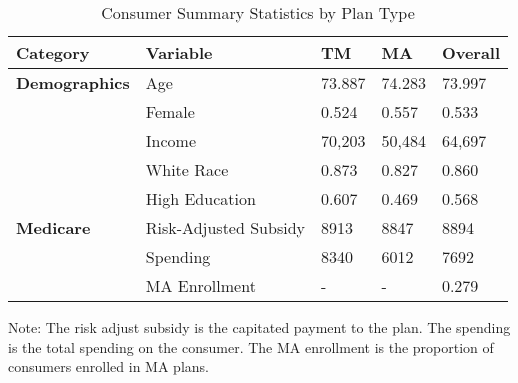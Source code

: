 \begin{table}[ht]
  \scriptsize
  \renewcommand{\arraystretch}{1.2}
  \centering
  \begin{threeparttable}
    \caption{Consumer Summary Statistics by Plan Type}
    \begin{tabular}{ll|lll}
      \toprule
      \textbf{Category} & \textbf{Variable} & \textbf{TM} & \textbf{MA} & \textbf{Overall} \\
      \midrule
      \textbf{Demographics} & Age & 73.887 & 74.283 & 73.997 \\
      & Female & 0.524 & 0.557 & 0.533 \\
      & Income & 70,203 & 50,484 & 64,697 \\
      & White Race & 0.873 & 0.827 & 0.860 \\
      & High Education & 0.607 & 0.469 & 0.568 \\
      \textbf{Medicare} & Risk-Adjusted Subsidy & 8913 & 8847 & 8894 \\
      & Spending & 8340 & 6012 & 7692 \\
      & MA Enrollment & - & - & 0.279 \\
      \bottomrule
    \end{tabular}
    \begin{tablenotes}
      \footnotesize
      \item Note: The risk adjust subsidy is the capitated payment to the plan. The spending is the total spending on the consumer. The MA enrollment is the proportion of consumers enrolled in MA plans.
    \end{tablenotes}
  \end{threeparttable}
  \label{tab:consumer_summary}
\end{table}
